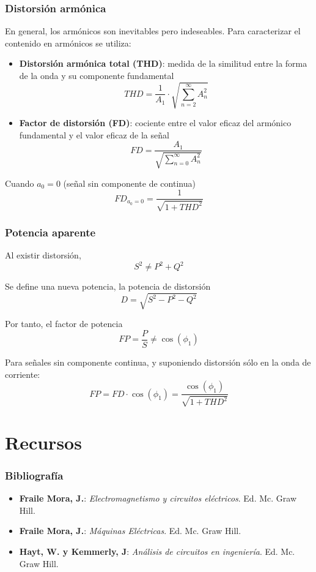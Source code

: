 \documentclass[serif, xcolor=dvipsnames]{beamer}
\begin{document}
\begin{frame}[plain]
  \frametitle{Distorsión armónica}

  En general, los armónicos son inevitables pero indeseables. Para
  caracterizar el contenido en armónicos se utiliza:
  \begin{itemize}
  \item \textbf{Distorsión armónica total (THD)}: medida de la
    similitud entre la forma de la onda y su componente fundamental
    \[
    THD=\frac{1}{A_{1}}\cdot\sqrt{\sum_{n=2}^{\infty}A_{n}^{2}}
    \]

  \item \textbf{Factor de distorsión (FD)}: cociente entre el valor
    eficaz del armónico fundamental y el valor eficaz de la señal
    \[
    FD=\frac{A_{1}}{\sqrt{\sum_{n=0}^{\infty}A_{n}^{2}}}
    \]

\end{itemize}
Cuando $a_{0}=0$ (señal sin componente de continua)
\[
FD_{a_{0}=0}=\frac{1}{\sqrt{1+THD^{2}}}
\]



\end{frame}
\begin{frame}
  \frametitle{Potencia aparente}

  Al existir distorsión,
  \[
  S^{2}\neq P^{2}+Q^{2}
  \]


  Se define una nueva potencia, la potencia de distorsión
  \[
  D=\sqrt{S^{2}-P^{2}-Q^{2}}
  \]


  Por tanto, el factor de potencia
  \[
  FP=\frac{P}{S}\neq\cos(\phi_{1})
  \]


  Para señales sin componente continua, y suponiendo distorsión sólo
  en la onda de corriente:
  \[
  FP=FD\cdot\cos(\phi_{1})=\frac{\cos(\phi_{1})}{\sqrt{1+THD^{2}}}
  \]



\end{frame}


\section{Recursos}

\begin{frame}
  \frametitle{Bibliografía}
  \begin{itemize}
  \item \textbf{Fraile Mora, J.}: \emph{Electromagnetismo y circuitos
      eléctricos}. Ed. Mc. Graw Hill.
  \item \textbf{Fraile Mora, J.}: \emph{Máquinas
      Eléctricas}. Ed. Mc. Graw Hill.
  \item \textbf{Hayt, W. y Kemmerly, J}: \emph{Análisis de circuitos
      en ingeniería}. Ed. Mc. Graw Hill.
  \end{itemize}
\end{frame}
\end{document}
